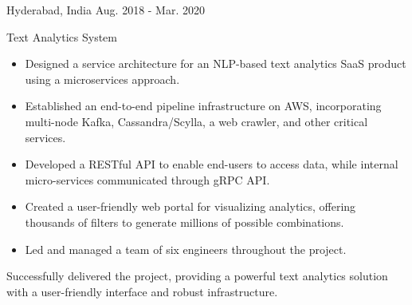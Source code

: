 \begin{cventries}
    {Hyderabad, India} %
    {Aug. 2018 - Mar. 2020} %
    {
      \begin{cvitems} %
        \item {Text Analytics System}
        \begin {itemize}
          \item Designed a service architecture for an NLP-based text analytics SaaS product using a microservices approach.
          \item Established an end-to-end pipeline infrastructure on AWS, incorporating multi-node Kafka, Cassandra/Scylla, a web crawler, and other critical services.
          \item Developed a RESTful API to enable end-users to access data, while internal micro-services communicated through gRPC API.
          \item Created a user-friendly web portal for visualizing analytics, offering thousands of filters to generate millions of possible combinations.
          \item Led and managed a team of six engineers throughout the project.
          \end{itemize}
        Successfully delivered the project, providing a powerful text analytics solution with a user-friendly interface and robust infrastructure.
        \end{cvitems}
    }


\end{cventries}
